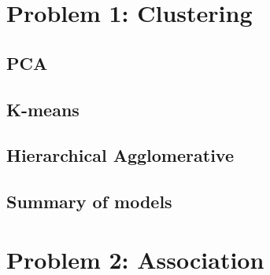 \documentclass[]{article}
\begin{document}
\hypertarget{problem-1-clustering}{%
\section{Problem 1: Clustering}\label{problem-1-clustering}}

\hypertarget{pca}{%
\subsection{PCA}\label{pca}}

\hypertarget{k-means}{%
\subsection{K-means}\label{k-means}}

\hypertarget{hierarchical-agglomerative}{%
\subsection{Hierarchical
Agglomerative}\label{hierarchical-agglomerative}}

\hypertarget{summary-of-models}{%
\subsection{Summary of models}\label{summary-of-models}}

\hypertarget{problem-2-association}{%
\section{Problem 2: Association}\label{problem-2-association}}
\end{document}
